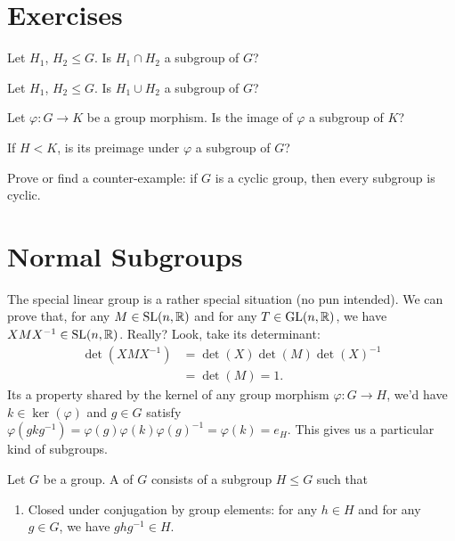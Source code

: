 \section{Exercises}

\begin{exercise}
  Let $H_{1}$, $H_{2}\leq G$. Is $H_{1}\cap H_{2}$ a subgroup of $G$?
\end{exercise}

\begin{exercise}
  Let $H_{1}$, $H_{2}\leq G$. Is $H_{1}\cup H_{2}$ a subgroup of $G$?
\end{exercise}

\begin{exercise}
Let $\varphi\colon G\to K$ be a group morphism. Is the image of
$\varphi$ a subgroup of $K$?

If $H<K$, is its preimage under $\varphi$ a subgroup of $G$?
\end{exercise}

\begin{exercise}
Prove or find a counter-example: if $G$ is a cyclic group, then every
subgroup is cyclic.
\end{exercise}

\section{Normal Subgroups}

\M\label{chunk:004-subgroups:motivation-for-normal-subgroup}
The special linear group is a rather special situation (no pun intended).
We can prove that, for any $M\in\mathrm{SL}(n,\mathbb{R})$ and for any
$T\in\mathrm{GL}(n,\mathbb{R})$, we have $XMX^{-1}\in\mathrm{SL}(n,\mathbb{R})$. Really? Look, take
its determinant:
\begin{equation}
  \begin{split}
    \det(XMX^{-1})&=\det(X)\det(M)\det(X)^{-1}\\
    &=\det(M)=1.
  \end{split}
\end{equation}
Its a property shared by the kernel of any group morphism
$\varphi\colon G\to H$, we'd have $k\in\ker(\varphi)$ and $g\in G$
satisfy $\varphi(gkg^{-1})=\varphi(g)\varphi(k)\varphi(g)^{-1}=\varphi(k)=e_{H}$.
This gives us a particular kind of subgroups.

\begin{definition}\label{defn:004-subgroups:normal-subgroup}
Let $G$ be a group. A  of $G$ consists of a
subgroup $H\leq G$ such that
\begin{enumerate}
\item Closed under conjugation by group elements: for any $h\in H$ and for any $g\in G$, we have $ghg^{-1}\in H$.
\end{enumerate}
\end{definition}

